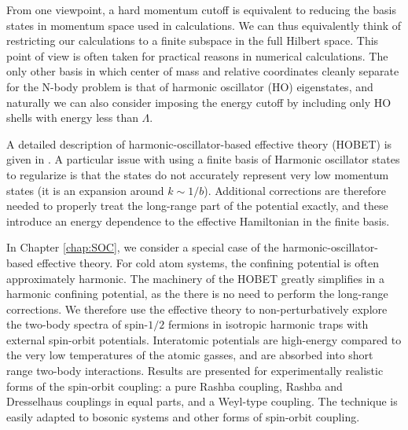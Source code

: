 From one viewpoint, a hard momentum cutoff is equivalent to reducing the basis states in momentum space used in calculations. We can thus equivalently think of restricting our calculations to a finite subspace in the full Hilbert space. This point of view is often taken for practical reasons in numerical calculations. The only other basis in which center of mass and relative coordinates cleanly separate for the N-body problem is that of harmonic oscillator (HO) eigenstates, and naturally we can also consider imposing the energy cutoff by including only HO shells with energy less than $\Lambda$. 

A detailed description of harmonic-oscillator-based effective theory (HOBET) is given in \cite{PhysRevC.77.034005}. A particular issue with using a finite basis of Harmonic oscillator states to regularize is that the states do not accurately represent very low momentum states (it is an expansion around $k\sim 1/b$). Additional corrections are therefore needed to properly treat the long-range part of the potential exactly, and these introduce an energy dependence to the effective Hamiltonian in the finite basis.

In Chapter \ref{chap:SOC}, we consider a special case of the harmonic-oscillator-based effective theory. For cold atom systems, the confining potential is often approximately harmonic. The machinery of the HOBET greatly simplifies in a harmonic confining potential, as the there is no need to perform the long-range corrections. We therefore use the effective theory to non-perturbatively explore the two-body spectra of spin-$1/2$ fermions in isotropic harmonic traps with external spin-orbit potentials. Interatomic potentials are high-energy compared to the very low temperatures of the atomic gasses, and are absorbed into short range two-body interactions. Results are presented for experimentally realistic forms of the spin-orbit coupling: a pure Rashba coupling, Rashba and Dresselhaus couplings in equal parts, and a Weyl-type coupling. The technique is easily adapted to bosonic systems and other forms of spin-orbit coupling.
